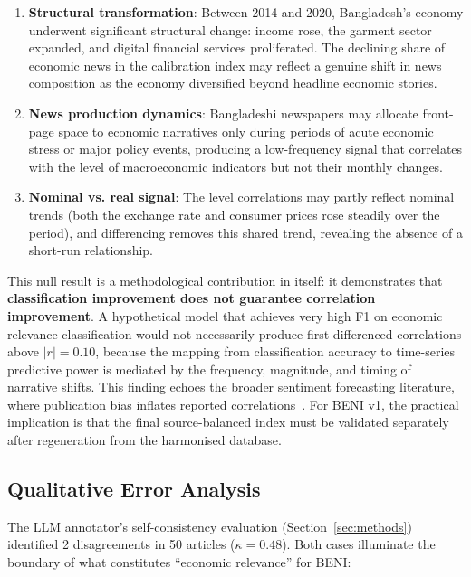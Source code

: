 \begin{enumerate}
    \item \textbf{Structural transformation}: Between 2014 and 2020, Bangladesh's economy underwent significant structural change: income rose, the garment sector expanded, and digital financial services proliferated. The declining share of economic news in the calibration index may reflect a genuine shift in news composition as the economy diversified beyond headline economic stories.
    \item \textbf{News production dynamics}: Bangladeshi newspapers may allocate front-page space to economic narratives only during periods of acute economic stress or major policy events, producing a low-frequency signal that correlates with the level of macroeconomic indicators but not their monthly changes.
    \item \textbf{Nominal vs. real signal}: The level correlations may partly reflect nominal trends (both the exchange rate and consumer prices rose steadily over the period), and differencing removes this shared trend, revealing the absence of a short-run relationship.
\end{enumerate}

This null result is a methodological contribution in itself: it demonstrates that \textbf{classification improvement does not guarantee correlation improvement}. A hypothetical model that achieves very high F1 on economic relevance classification would not necessarily produce first-differenced correlations above $|r| = 0.10$, because the mapping from classification accuracy to time-series predictive power is mediated by the frequency, magnitude, and timing of narrative shifts. This finding echoes the broader sentiment forecasting literature, where publication bias inflates reported correlations~\citep{nabil2026economic}. For BENI v1, the practical implication is that the final source-balanced index must be validated separately after regeneration from the harmonised database.

\subsection{Qualitative Error Analysis}

The LLM annotator's self-consistency evaluation (Section~\ref{sec:methods}) identified 2 disagreements in 50 articles ($\kappa = 0.48$). Both cases illuminate the boundary of what constitutes ``economic relevance'' for BENI:

